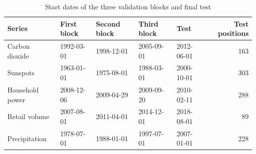 \begin{table}[t]
\caption{Start dates of the three validation blocks and final test}
\label{tab:splits}
\centering\small
\begin{tabular}{lllllr}
\toprule
Series & First block & Second block & Third block & Test & Test positions \\
\midrule
Carbon dioxide & 1992-03-01 & 1998-12-01 & 2005-09-01 & 2012-06-01 & 163 \\
Sunspots & 1963-01-01 & 1975-08-01 & 1988-03-01 & 2000-10-01 & 303 \\
Household power & 2008-12-06 & 2009-04-29 & 2009-09-20 & 2010-02-11 & 288 \\
Retail volume & 2007-08-01 & 2011-04-01 & 2014-12-01 & 2018-08-01 & 89 \\
Precipitation & 1978-07-01 & 1988-01-01 & 1997-07-01 & 2007-01-01 & 228 \\
\bottomrule
\end{tabular}
\end{table}
